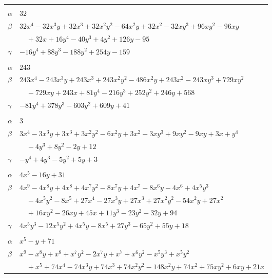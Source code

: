 \documentclass[11pt]{article}
\begin{document}
\begin{longtable}{@{}ll@{}}
\addlinespace[3pt]
\multicolumn{2}{@{}l}{$\{i,j\}=\{8,15\}$, $k_{ij}=3\cdot 5\cdot 17$}\\
$\alpha$ & $32$\\
$\beta$ & $32x^{4}-32x^{3}y+32x^{3}+32x^{2}y^{2}-64x^{2}y+32x^{2}-32xy^{3}+96xy^{2}-96xy$\\
 & $\quad +32x+16y^{4}-40y^{3}+4y^{2}+126y-95$\\
$\gamma$ & $-16y^{4}+88y^{3}-188y^{2}+254y-159$\\
\addlinespace[3pt]
\multicolumn{2}{@{}l}{$\{i,j\}=\{8,17\}$, $k_{ij}=2\cdot 5\cdot 7\cdot 11$}\\
$\alpha$ & $243$\\
$\beta$ & $243x^{4}-243x^{3}y+243x^{3}+243x^{2}y^{2}-486x^{2}y+243x^{2}-243xy^{3}+729xy^{2}$\\
 & $\quad -729xy+243x+81y^{4}-216y^{3}+252y^{2}+246y+568$\\
$\gamma$ & $-81y^{4}+378y^{3}-603y^{2}+609y+41$\\
\addlinespace[3pt]
\multicolumn{2}{@{}l}{$\{i,j\}=\{8,18\}$, $k_{ij}=2\cdot 3^{2}$}\\
$\alpha$ & $3$\\
$\beta$ & $3x^{4}-3x^{3}y+3x^{3}+3x^{2}y^{2}-6x^{2}y+3x^{2}-3xy^{3}+9xy^{2}-9xy+3x+y^{4}$\\
 & $\quad -4y^{3}+8y^{2}-2y+12$\\
$\gamma$ & $-y^{4}+4y^{3}-5y^{2}+5y+3$\\
\addlinespace[3pt]
\multicolumn{2}{@{}l}{$\{i,j\}=\{8,23\}$, $k_{ij}=5^{3}$}\\
$\alpha$ & $4x^{5}-16y+31$\\
$\beta$ & $4x^{9}-4x^{8}y+4x^{8}+4x^{7}y^{2}-8x^{7}y+4x^{7}-8x^{6}y-4x^{6}+4x^{5}y^{3}$\\
 & $\quad -4x^{5}y^{2}-8x^{5}+27x^{4}-27x^{3}y+27x^{3}+27x^{2}y^{2}-54x^{2}y+27x^{2}$\\
 & $\quad +16xy^{2}-26xy+45x+11y^{3}-23y^{2}-32y+94$\\
$\gamma$ & $4x^{5}y^{3}-12x^{5}y^{2}+4x^{5}y-8x^{5}+27y^{3}-65y^{2}+55y+18$\\
\addlinespace[3pt]
\multicolumn{2}{@{}l}{$\{i,j\}=\{8,25\}$, $k_{ij}=2^{3}\cdot 3^{3}$}\\
$\alpha$ & $x^{5}-y+71$\\
$\beta$ & $x^{9}-x^{8}y+x^{8}+x^{7}y^{2}-2x^{7}y+x^{7}+x^{6}y^{2}-x^{5}y^{3}+x^{5}y^{2}$\\
 & $\quad +x^{5}+74x^{4}-74x^{3}y+74x^{3}+74x^{2}y^{2}-148x^{2}y+74x^{2}+75xy^{2}+6xy+21x$\\

\end{longtable}
\end{document}
